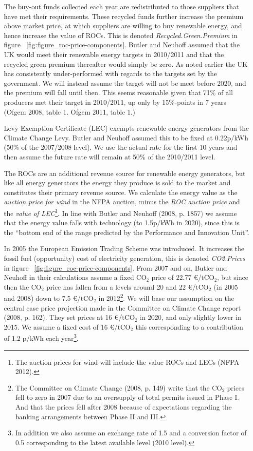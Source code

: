 \documentclass[a4paper, 12pt]{article}
\begin{document}
The buy-out funds collected each year are redistributed to those suppliers that have met their requirements. These recycled funds further increase the premium above market price, at which suppliers are willing to buy renewable energy, and hence increase the value of ROCs. This is denoted \emph{Recycled.Green.Premium} in figure ~\ref{fig:figure_roc-price-components}. Butler and Neuhoff assumed that the UK would meet their renewable energy targets in 2010/2011 and that the recycled green premium thereafter would simply be zero. As noted earlier the UK has consistently under-performed with regards to the targets set by the government. We will instead assume the target will not be meet before 2020, and the premium will fall until then. This seems reasonable given that 71\% of all producers met their target in 2010/2011, up only by 15\%-points in 7 years (Ofgem 2008, table 1. Ofgem 2011, table 1.) 

Levy Exemption Certificate (LEC) exempts renewable energy generators from the Climate Change Levy. Butler and Neuhoff assumed this to be fixed at 0.22p/kWh (50\% of the 2007/2008 level). We use the actual rate for the first 10 years and then assume the future rate will remain at 50\% of the 2010/2011 level.

The ROCs are an additional revenue source for renewable energy generators, but like all energy generators the energy they produce is sold to the market and constitutes their primary revenue source. We calculate the energy value as the \emph{auction price for wind} in the NFPA auction, minus the \emph{ROC auction price} and the \emph{value of LEC}\footnote{The auction prices for wind will include the value ROCs and LECs (NFPA 2012).}. In line with Butler and Neuhoff (2008, p. 1857) we assume that the energy value falls with technology (to 1.5p/kWh in 2020), since this is the ``bottom end of the range predicted by the Performance and Innovation Unit''.

In 2005 the European Emission Trading Scheme was introduced. It increases the fossil fuel (opportunity) cost of electricity generation, this is denoted \emph{CO2.Prices} in figure ~\ref{fig:figure_roc-price-components}. From 2007 and on, Butler and Neuhoff in their calculations assume a fixed $\text{CO}_2$ price of 22.77 €/$\text{tCO}_2$, but since then the $\text{CO}_2$ price has fallen from a levels around 20 and 22 €/$\text{tCO}_2$ (in 2005 and 2008) down to 7.5 €/$\text{tCO}_2$ in 2012\footnote{The Committee on Climate Change (2008, p. 149) write that the $\text{CO}_2$ prices fell to zero in 2007 due to an oversupply of total permits issued in Phase I. And that the prices fell after 2008 because of expectations regarding the banking arrangements between Phase II and III.}. We will base our assumption on the central case price projection made in the Committee on Climate Change report (2008, p. 162). They set prices at 16 €/$\text{tCO}_2$ in 2020, and only slightly lower in 2015. We assume a fixed cost of 16 €/$\text{tCO}_2$ this corresponding to a contribution of 1.2 p/kWh each year\footnote{In addition we also assume an exchange rate of 1.5 and a conversion factor of 0.5 corresponding to the latest available level (2010 level).}.
\end{document}
